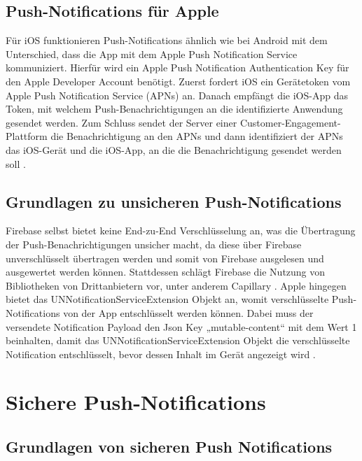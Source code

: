 \documentclass[sigconf]{acmart}
\begin{document}
\subsection{Push-Notifications für Apple}

Für iOS funktionieren Push-Notifications ähnlich wie bei Android 
mit dem Unterschied, dass die App mit dem Apple Push Notification 
Service kommuniziert. Hierfür wird ein Apple Push Notification 
Authentication Key für den Apple Developer Account benötigt. 
Zuerst fordert iOS ein Gerätetoken vom Apple Push Notification 
Service (APNs) an. Danach empfängt die iOS-App das Token, mit 
welchem Push-Benachrichtigungen an die identifizierte Anwendung 
gesendet werden. Zum Schluss sendet der Server einer 
Customer-Engagement-Plattform die Benachrichtigung an den APNs 
und dann identifiziert der APNs das iOS-Gerät und die iOS-App, 
an die die Benachrichtigung gesendet werden soll \cite{apple}.

\subsection{Grundlagen zu unsicheren Push-Notifications}

Firebase selbst bietet keine End-zu-End Verschlüsselung an, was 
die Übertragung der Push-Benachrichtigungen unsicher macht, da 
diese über Firebase unverschlüsselt übertragen werden und somit 
von Firebase ausgelesen und ausgewertet werden können. Stattdessen 
schlägt Firebase die Nutzung von Bibliotheken von Drittanbietern vor, 
unter anderem Capillary \cite{firebase2}.
Apple hingegen bietet das UNNotificationServiceExtension Objekt an, 
womit verschlüsselte Push-Notifications von der App entschlüsselt 
werden können. Dabei muss der versendete Notification Payload den 
Json Key „mutable-content“ mit dem Wert 1 beinhalten, damit das 
UNNotificationServiceExtension Objekt die verschlüsselte Notification 
entschlüsselt, bevor dessen Inhalt im Gerät angezeigt wird \cite{apple1}\cite{apple2}.

\section{Sichere Push-Notifications}

\subsection{Grundlagen von sicheren Push Notifications}
\end{document}
